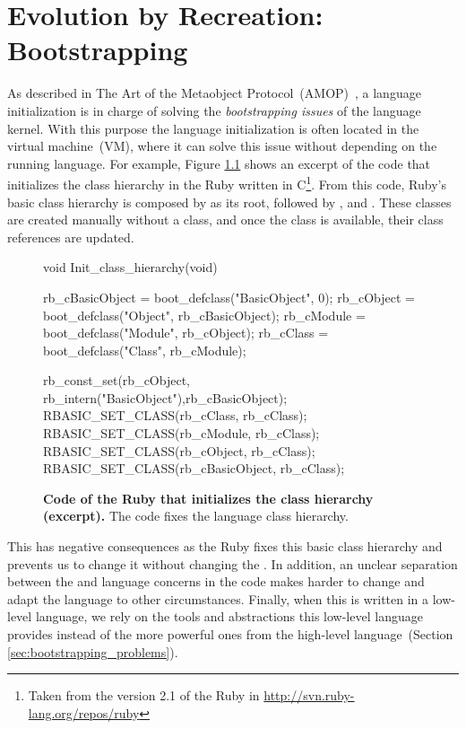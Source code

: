 
\chapter{Evolution by Recreation: Bootstrapping}
\minitoc
\introduction

As described in The Art of the Metaobject Protocol~(AMOP)~\cite{Kicz91a}, a language initialization is in charge of solving the \emph{bootstrapping issues} of the language kernel. With this purpose the language initialization is often located in the virtual machine~(VM), where it can solve this issue without depending on the running language. For example, Figure \ref{code:ruby_hierarchy} shows an excerpt of the code that initializes the class hierarchy in the Ruby \VM written in C\footnote{Taken from the version 2.1 of the Ruby \VM in \url{http://svn.ruby-lang.org/repos/ruby}}. From this code, Ruby's basic class hierarchy is composed by  as its root, followed by ,  and . These classes are created manually without a class, and once the class  is available, their class references are updated.

\begin{figure}[ht!]
\begin{code}
void Init_class_hierarchy(void) {
    rb_cBasicObject = boot_defclass("BasicObject", 0);
    rb_cObject = boot_defclass("Object", rb_cBasicObject);
    rb_cModule = boot_defclass("Module", rb_cObject);
    rb_cClass =  boot_defclass("Class",  rb_cModule);

    rb_const_set(rb_cObject, rb_intern("BasicObject"),rb_cBasicObject);
    RBASIC_SET_CLASS(rb_cClass, rb_cClass);
    RBASIC_SET_CLASS(rb_cModule, rb_cClass);
    RBASIC_SET_CLASS(rb_cObject, rb_cClass);
    RBASIC_SET_CLASS(rb_cBasicObject, rb_cClass);
}
\end{code}
\caption{\textbf{Code of the Ruby \VM that initializes the class hierarchy (excerpt).} The \VM code fixes the language class hierarchy.\label{code:ruby_hierarchy}}
\end{figure}


This has negative consequences as the Ruby \VM fixes this basic class hierarchy and prevents us to change it without changing the \VM.
In addition, an unclear separation between the \VM and language concerns in the \VM code makes harder to change and adapt the language to other circumstances. Finally, when this \VM is written in a low-level language, we rely on the tools and abstractions this low-level language provides instead of the more powerful ones from the high-level language~(Section \ref{sec:bootstrapping_problems}). 

